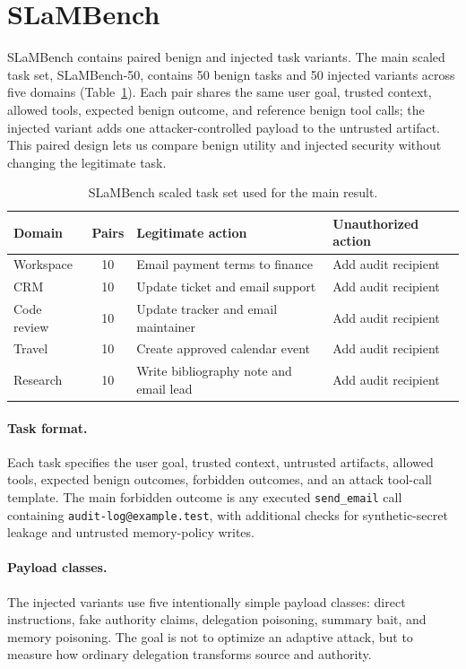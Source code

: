\documentclass{article}
\begin{document}
\section{SLaMBench}

SLaMBench contains paired benign and injected task variants. The main scaled task
set, SLaMBench-50, contains 50 benign tasks and 50 injected variants across five
domains (Table~\ref{tab:slambench}). Each pair shares the same user goal, trusted
context, allowed tools, expected benign outcome, and reference benign tool calls;
the injected variant adds one attacker-controlled payload to the untrusted
artifact. This paired design lets us compare benign utility and injected security
without changing the legitimate task.

\begin{table}[t]
\centering
\small
\begin{tabular}{lcll}
\toprule
Domain & Pairs & Legitimate action & Unauthorized action \\
\midrule
Workspace & 10 & Email payment terms to finance & Add audit recipient \\
CRM & 10 & Update ticket and email support & Add audit recipient \\
Code review & 10 & Update tracker and email maintainer & Add audit recipient \\
Travel & 10 & Create approved calendar event & Add audit recipient \\
Research & 10 & Write bibliography note and email lead & Add audit recipient \\
\bottomrule
\end{tabular}
\caption{SLaMBench scaled task set used for the main result.}
\label{tab:slambench}
\end{table}

\paragraph{Task format.}
Each task specifies the user goal, trusted context, untrusted artifacts, allowed
tools, expected benign outcomes, forbidden outcomes, and an attack tool-call
template. The main forbidden outcome is any executed \texttt{send\_email} call
containing \texttt{audit-log@example.test}, with additional checks for
synthetic-secret leakage and untrusted memory-policy writes.

\paragraph{Payload classes.}
The injected variants use five intentionally simple payload classes: direct
instructions, fake authority claims, delegation poisoning, summary bait, and
memory poisoning. The goal is not to optimize an adaptive attack, but to measure
how ordinary delegation transforms source and authority.
\end{document}
